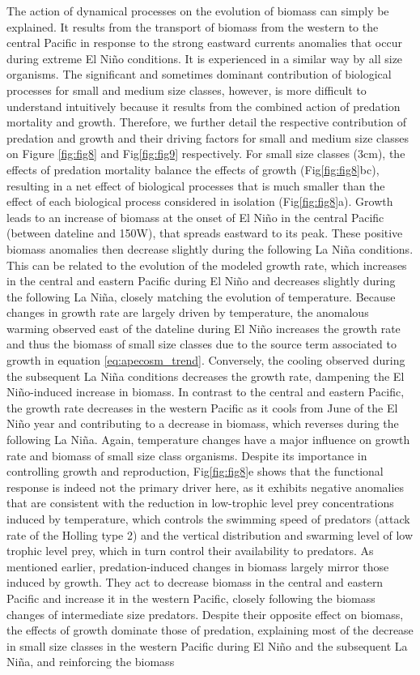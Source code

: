 The action of dynamical processes on the evolution of biomass can simply be explained. It results from the transport of biomass from the western to the central Pacific in response to the strong eastward currents anomalies that occur during extreme El Niño conditions. It is experienced in a similar way by all size organisms. The significant and sometimes dominant contribution of biological processes for small and medium size classes, however, is more difficult to understand intuitively because it results from the combined action of predation mortality and growth. Therefore, we further detail the respective contribution of predation and growth and their driving factors for small and medium size classes on Figure \ref{fig:fig8} and Fig\ref{fig:fig9} respectively. For small size classes (3cm), the effects of predation mortality balance the effects of growth (Fig\ref{fig:fig8}bc),  resulting in a net effect of biological processes that is much smaller than the effect of each biological process considered in isolation (Fig\ref{fig:fig8}a). Growth leads to an increase  of biomass at the onset of El Niño in the central Pacific (between dateline and 150\degree{}W), that spreads eastward to its peak. These positive biomass anomalies then decrease slightly during the following La Niña conditions. This can be related to the evolution of the modeled growth rate, which increases in the central and eastern Pacific during El Niño and decreases slightly during the following La Niña, closely matching the evolution of temperature. Because changes in growth rate are largely driven by temperature, the anomalous warming observed east of the dateline during El Niño increases the growth rate and thus the biomass of small size classes due to the source term associated to growth in equation \ref{eq:apecosm_trend}. Conversely, the cooling observed during the subsequent La Niña conditions decreases the growth rate, dampening the El Niño-induced increase in biomass. In contrast to the central and eastern Pacific, the growth rate decreases in the western Pacific as it cools from June of the El Niño year and  contributing to a decrease in biomass, which reverses during the following La Niña. Again, temperature changes have a major influence on growth rate and biomass of small size class organisms. Despite its importance in controlling growth and reproduction, Fig\ref{fig:fig8}e shows that the functional response is indeed not the primary driver here, as it exhibits negative anomalies that are consistent with the reduction in low-trophic level prey concentrations induced by temperature, which controls the swimming speed of predators (attack rate of the Holling type 2) and the vertical distribution and swarming level of low trophic level prey, which in turn control their availability to predators. As mentioned earlier, predation-induced changes in biomass largely mirror those induced by growth. They act to decrease biomass in the central and eastern Pacific and increase it in the western Pacific, closely following the biomass changes of intermediate size predators. Despite their opposite effect on biomass, the effects of growth dominate those of predation, explaining most of the decrease in small size classes in the western Pacific during El Niño and the subsequent La Niña, and reinforcing the biomass 